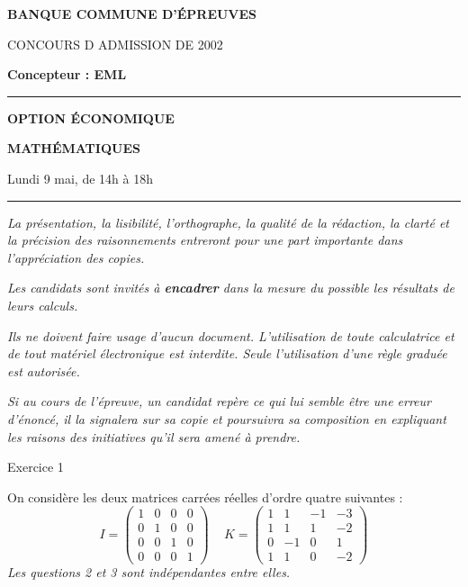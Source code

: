 \documentclass[11pt]{article}%
\begin{document}

\begin{center}
{\LARG\E\textbf{BANQUE COMMUNE D'ÉPREUVES}}



{\large \textsc{CONCOURS D ADMISSION DE 2002}}



{\large \textbf{Concepteur : EML}}



\rule{2.39cm}{0.05cm}



{\Large \textbf{OPTION ÉCONOMIQUE}}



{\Large \textbf{MATHÉMATIQUES }}



{\Large Lundi 9 mai, de 14h à 18h}



\rule{2.39cm}{0.05cm}
\end{center}

\textit{La présentation, la lisibilité, l'orthographe, la qualité
de la rédaction, la clarté et la précision des raisonnements
entreront pour une part importante dans l'appréciation des copies.}

\textit{Les candidats sont invités à \textbf{encadrer} dans la mesure
du possible les résultats de leurs calculs.}

\textit{Ils ne doivent faire usage d'aucun document. L'utilisation de
toute
calculatrice et de tout matériel électronique est interdite. Seule
l'utilisation d'une règle graduée est autorisée.}

\textit{Si au cours de l'épreuve, un candidat repère ce qui lui semble
être une erreur d'énoncé, il la signalera sur sa copie et
poursuivra sa composition en expliquant les raisons des initiatives
qu'il sera
amené à prendre.}

\vspace*{3cm}


\begin{center}
{\LARGE Exercice 1}
\end{center}

\noindent On considère les deux matrices carrées réelles d'ordre
quatre suivantes : 
\[
I = \left( 
\begin{array}{rrrr}
1 & 0 & 0 & 0 \\
0 & 1 & 0 & 0 \\
0 & 0 & 1 & 0 \\
0 & 0 & 0 & 1
\end{array}
\right) \,\quad K = \left( 
\begin{array}{rrrr}
1 & 1 & -1 & -3 \\
1 & 1 & 1 & -2 \\
0 & -1 & 0 & 1 \\
1 & 1 & 0 & -2
\end{array}
\right) 
\]
\textsl{Les questions 2 et 3 sont indépendantes entre elles.}
\end{document}
